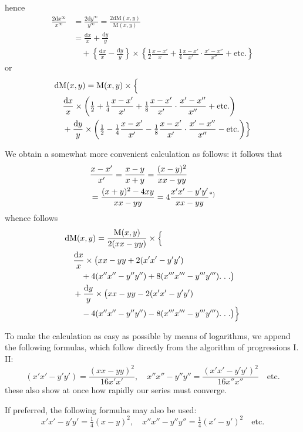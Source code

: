 hence
\[
\begin{aligned}
\frac{2\mathrm{d}x^\infty}{x^\infty}
&=\frac{2\mathrm{d}y^\infty}{y^\infty}
=\frac{2\mathrm{d}\mathrm{M}(x,y)}{\mathrm{M}(x,y)}\\[7pt]
&=\frac{\mathrm{d}x}{x}+\frac{\mathrm{d}y}{y}\\&\quad+\left\{\frac{\mathrm{d}x}{x}-\frac{\mathrm{d}y}{y}\right\}\times
\left\{\tfrac12\frac{x-x'}{x}+\tfrac14\frac{x-x'}{x'}\cdot\frac{x'-x''}{x''}+\mathrm{etc.}\right\}
\end{aligned}
\]
or
\[
\begin{aligned}
&\mathrm{d}\mathrm{M}(x,y)=\mathrm{M}(x,y)\times\Bigl\{\\&\quad\frac{\mathrm{d}x}{x}\times\left(\tfrac12+\tfrac14\frac{x-x'}{x'}+\tfrac18\frac{x-x'}{x'}\cdot\frac{x'-x''}{x''}+\mathrm{etc.}\right)\\&\quad+\frac{\mathrm{d}y}{y}\times\left(\tfrac12-\tfrac14\frac{x-x'}{x'}-\tfrac18\frac{x-x'}{x'}\cdot\frac{x'-x''}{x''}-\mathrm{etc.}\right)\Bigr\}
\end{aligned}
\]
\par We obtain a somewhat more convenient calculation as follows: it follows that
\[
\begin{aligned}&\frac{x-x'}{x'}=\frac{x-y}{x+y}=\frac{(x-y)^2}{xx-yy}\\&=\frac{(x+y)^2-4xy}{xx-yy}=4\frac{x'x'-y'y'}{xx-yy}\text{\textsuperscript{*)}}\end{aligned}
\]
whence follows
\[
\begin{aligned}
&\mathrm{d}\mathrm{M}(x,y)=\frac{\mathrm{M}(x,y)}{2(xx-yy)}\times\Bigl\{\\&\quad\frac{\mathrm{d}x}{x}\times\bigl(xx-yy+2(x'x'-y'y')\\&\qquad+4(x''x''-y''y'')+8(x'''x'''-y'''y''').\;.\;.\bigr)\\&\quad+\frac{\mathrm{d}y}{y}\times\bigl(xx-yy-2(x'x'-y'y')\\&\qquad-4(x''x''-y''y'')-8(x'''x'''-y'''y''').\;.\;.\bigr)\Bigr\}
\end{aligned}
\]
\par 
To make the calculation as easy as possible by means of logarithms, we append the following formulas, which follow directly from the algorithm of progressions I. II:
\[
(x'x'-y'y')=\frac{(xx-yy)^2}{16x'x'},\quad
x''x''-y''y''=\frac{(x'x'-y'y')^2}{16x''x''}\quad\mathrm{etc.}
\]
these also show at once how rapidly our series must converge.

\par If preferred, the following formulas may also be used:
\[
x'x'-y'y'=\tfrac14(x-y)^2,\quad
x''x''-y''y''=\tfrac14(x'-y')^2\quad\mathrm{etc.}
\]

\clearpage
\endgroup
